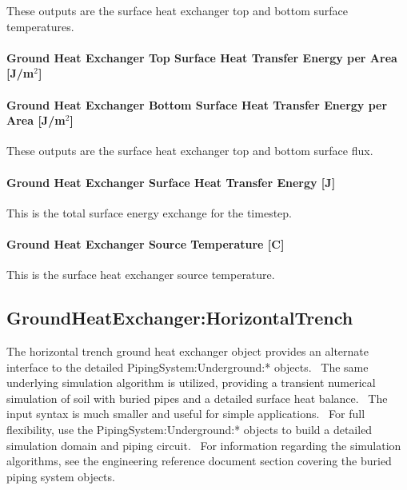 These outputs are the surface heat exchanger top and bottom surface temperatures.

\paragraph{Ground Heat Exchanger Top Surface Heat Transfer Energy per Area~ {[}J/m\(^{2}\){]}}\label{ground-heat-exchanger-top-surface-heat-transfer-energy-per-area-jm2}

\paragraph{Ground Heat Exchanger Bottom Surface Heat Transfer Energy per Area {[}J/m\(^{2}\){]}}\label{ground-heat-exchanger-bottom-surface-heat-transfer-energy-per-area-jm2}

These outputs are the surface heat exchanger top and bottom surface flux.

\paragraph{Ground Heat Exchanger Surface Heat Transfer Energy {[}J{]}}\label{ground-heat-exchanger-surface-heat-transfer-energy-j}

This is the total surface energy exchange for the timestep.

\paragraph{Ground Heat Exchanger Source Temperature {[}C{]}}\label{ground-heat-exchanger-source-temperature-c}

This is the surface heat exchanger source temperature.

\subsection{GroundHeatExchanger:HorizontalTrench}\label{groundheatexchangerhorizontaltrench}

The horizontal trench ground heat exchanger object provides an alternate interface to the detailed PipingSystem:Underground:* objects.~ The same underlying simulation algorithm is utilized, providing a transient numerical simulation of soil with buried pipes and a detailed surface heat balance.~ The input syntax is much smaller and useful for simple applications.~ For full flexibility, use the PipingSystem:Underground:* objects to build a detailed simulation domain and piping circuit.~ For information regarding the simulation algorithms, see the engineering reference document section covering the buried piping system objects.

